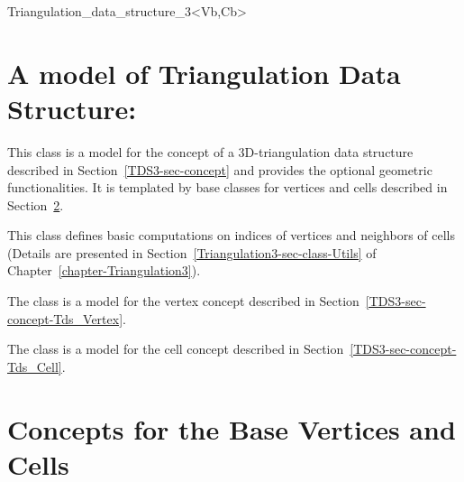 \begin{ccClassTemplate}{Triangulation_data_structure_3<Vb,Cb>}
\section{A model of Triangulation Data Structure:\\ 
\protect \ccClassTemplateName}
\label{TDS3-sec-class}

This class is a model for the concept of a 3D-triangulation data structure
described in Section~\ref{TDS3-sec-concept} and provides the optional
geometric functionalities. It is templated by base classes for
vertices and cells described in Section~\ref{TDS3-sec-concept-Base}.

This class defines basic computations on indices of vertices and
neighbors of cells (Details are presented in
Section~\ref{Triangulation3-sec-class-Utils} of
Chapter~\ref{chapter-Triangulation3}).


The class  is a model for the vertex
concept described in Section~\ref{TDS3-sec-concept-Tds_Vertex}.


The class  is a model for the
cell concept described in Section~\ref{TDS3-sec-concept-Tds_Cell}.


	\end{ccClassTemplate} 

\section{Concepts for the Base Vertices and Cells}
\label{TDS3-sec-concept-Base}

